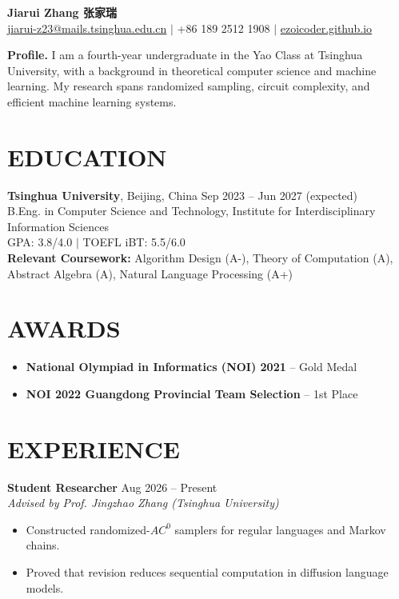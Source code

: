 \documentclass[11pt,a4paper]{article}
\newcommand{\entry}[4]{%
  \textbf{#1} \hfill {\small #2}\\[-1pt]
  \textit{#3} \hfill {\small\textit{#4}}%
}
\begin{document}
\begin{center}
  {\LARGE\bfseries\color{textgray} \latinGaramond Jiarui Zhang \;\textnormal{\large {张家瑞}}}\\[3pt]
  \href{mailto:jiarui-z23@mails.tsinghua.edu.cn}{jiarui-z23@mails.tsinghua.edu.cn}
  \quad $\vert$ \quad +86 189 2512 1908
  \quad $\vert$ \quad \href{https://ezoicoder.github.io}{ezoicoder.github.io}
\end{center}

\vspace{-3pt}
\textbf{Profile.} I am a fourth-year undergraduate in the Yao Class at Tsinghua University, with a background in theoretical computer science and machine learning. My research spans randomized sampling, circuit complexity, and efficient machine learning systems.

\section*{EDUCATION}
\textbf{Tsinghua University}, Beijing, China \hfill {\small Sep 2023 -- Jun 2027 (expected)}\\[-1pt]
B.Eng. in Computer Science and Technology, Institute for Interdisciplinary Information Sciences\\[-1pt]
GPA: 3.8/4.0 \quad $\vert$ \quad TOEFL iBT: 5.5/6.0\\[-1pt]
\textbf{Relevant Coursework:} Algorithm Design (A-), Theory of Computation (A), Abstract Algebra (A), Natural Language Processing (A+)

\section*{AWARDS}
\begin{itemize}
  \item \textbf{National Olympiad in Informatics (NOI) 2021} -- Gold Medal
  \item \textbf{NOI 2022 Guangdong Provincial Team Selection} -- 1st Place
\end{itemize}

\section*{EXPERIENCE}
\entry{Student Researcher}{Aug 2026 -- Present}{Advised by Prof. Jingzhao Zhang (Tsinghua University)}{}
\begin{itemize}
  \item Constructed randomized-$AC^0$ samplers for regular languages and Markov chains.
  \item Proved that revision reduces sequential computation in diffusion language models.
\end{itemize}
\end{document}
